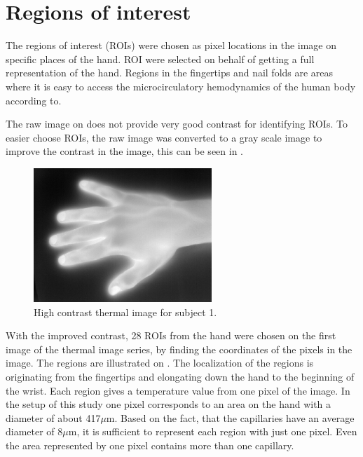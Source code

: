 \section{Regions of interest}

The regions of interest (ROIs) were chosen as pixel locations in the image on specific places of the hand. ROI were selected on behalf of getting a full representation of the hand. 
Regions in the fingertips and nail folds are areas where it is easy to access the microcirculatory hemodynamics of the human body according to\cite{Iabichella2006}. 

The raw image on  does not provide very good contrast for identifying ROIs. To easier choose ROIs, the raw image was converted to a gray scale image to improve the contrast in the image, this can be seen in . 

\begin{figure}[H]
	\includegraphics[width=0.6\textwidth]{figures/mat2grayHand}  %
	\caption{High contrast thermal image for subject 1.}
	\label{fig:mat2grayHand}  %
\end{figure}

With the improved contrast, 28 ROIs from the hand were chosen on the first image of the thermal image series, by finding the coordinates of the pixels in the image. The regions are illustrated on . The localization of the regions is originating from the fingertips and elongating down the hand to the beginning of the wrist. Each region gives a temperature value from one pixel of the image. In the setup of this study one pixel corresponds to an area on the hand with a diameter of about 417$\mu$m. Based on the fact, that the capillaries have an average diameter of 8$\mu$m\cite{martini2012}, it is sufficient to represent each region with just one pixel. Even the area represented by one pixel contains more than one capillary.

